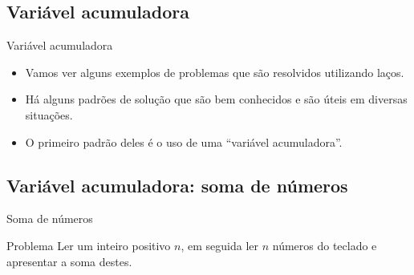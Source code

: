 \documentclass[handout]{beamer}
\begin{document}
\subsection{Variável acumuladora}%

\begin{frame}{Variável acumuladora}
    \begin{itemize}
        \item Vamos ver alguns exemplos de problemas que são resolvidos utilizando laços.
        \item Há alguns padrões de solução que são bem conhecidos e são úteis em diversas situações.
        \item O primeiro padrão deles é o uso de uma ``variável acumuladora''.
    \end{itemize}
\end{frame}

\subsection{Variável acumuladora: soma de números}%

\begin{frame}{Soma de números}
    \begin{block}{Problema}
        Ler um inteiro positivo $n$, em seguida ler $n$ números do teclado e apresentar a soma destes.
    \end{block}
\end{frame}
\end{document}
